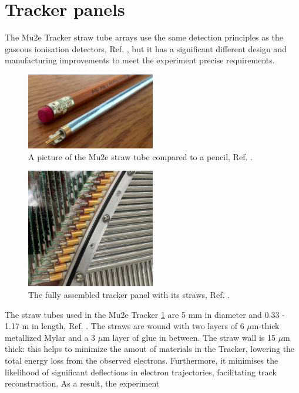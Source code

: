 \section{Tracker panels}
The Mu2e Tracker straw tube arrays use the same detection principles as the gaseous ionisation detectors, Ref. \cite{kola}, 
but it has a significant different design and manufacturing improvements to meet the experiment precise requirements.
\begin{figure}[!h]
    \centering
    \includegraphics[width =0.5\textwidth]{figures/png/Screenshot_20240327_000000.png}
    \caption{A picture of the Mu2e straw tube
    compared to a pencil, Ref. \cite{trk}.}
    \label{fig:trkpencil}
    \end{figure}
    \begin{figure}[!h]
        \centering
        \includegraphics[width =0.5\textwidth]{figures/png/Screenshot_20240327_000131.png}
        \caption{The fully assembled tracker panel with its straws, Ref. \cite{trk}.}
        \label{fig:strawtubes}
        \end{figure}
The straw tubes used in the Mu2e Tracker \ref{fig:trkpencil} are 5 mm in diameter and 0.33 - 1.17 m in length, 
Ref. \cite{bartoszek2015mu2e}. The straws are wound with two layers of 6 $\mu$m-thick metallized Mylar and a 3 
$\mu$m layer of glue in between. The straw wall is 15 $\mu$m thick: this helps to minimize the amout of materials 
in the Tracker, lowering the total energy loss from the observed electrons. Furthermore, it minimises the likelihood 
of significant deflections in electron trajectories, facilitating track reconstruction. As a result, the experiment 
